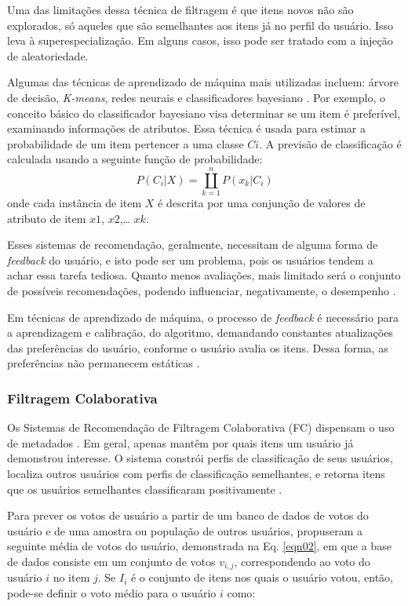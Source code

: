 Uma das limitações dessa técnica de filtragem é que itens novos não são explorados, só aqueles que são semelhantes 
aos itens já no perfil do usuário. Isso leva à superespecialização. Em alguns casos, isso pode ser tratado com a 
injeção de aleatoriedade\cite{paulson2003}.


Algumas das técnicas de aprendizado de máquina mais utilizadas incluem: árvore de decisão, \emph{K-means}, redes neurais e classificadores 
bayesiano \cite{son2017}. Por exemplo, o conceito básico do classificador bayesiano visa determinar se um item é preferível, examinando informações de 
atributos. Essa técnica é usada para estimar a probabilidade de um item 
pertencer a uma classe $Ci$. A previsão de classificação é calculada usando a 
seguinte função de probabilidade:
\begin{equation}
	P(C_{i}|X) = \coprod _{k=1}^{n} P(x_{k}|C_{i})
\end{equation}
onde cada instância de item $X$ é descrita por uma conjunção de valores de atributo de item $x1$, $x2$,… $xk$. 


Esses sistemas de recomendação, geralmente, necessitam de alguma forma de \emph{feedback} do usuário, e isto pode ser 
um problema, pois os usuários tendem a achar essa tarefa tediosa. Quanto menos avaliações, mais limitado 
será o conjunto de possíveis recomendações, podendo influenciar, negativamente, o desempenho \cite{paulson2003}. 

Em técnicas de aprendizado de máquina, o processo de \emph{feedback} é necessário para a aprendizagem e calibração, 
do algoritmo, demandando constantes atualizações das preferências do usuário, conforme o usuário avalia os itens. Dessa forma, 
as preferências não permanecem estáticas \cite{paulson2003}. 



\subsubsection{Filtragem Colaborativa}

Os Sistemas de Recomendação de Filtragem Colaborativa (FC) dispensam o uso de metadados \cite{mauricio}. 
Em geral, apenas mantêm por quais itens um usuário já demonstrou interesse. O sistema constrói perfis de classificação 
de seus usuários, localiza outros usuários com perfis de classificação 
semelhantes, e retorna itens que os usuários semelhantes classificaram 
positivamente \cite{son2017}.

Para prever os votos de usuário a partir de um banco de dados de votos do usuário e de uma amostra ou população de outros usuários, 
 propuseram a seguinte média de votos do usuário, demonstrada na  Eq. \ref{eqn02}, em que a base de dados 
consiste em um conjunto de votos $v_{i,j}$, correspondendo ao voto do usuário $i$ no item $j$. Se $I_{i}$ é o
conjunto de itens nos quais o usuário votou, então, pode-se definir o voto médio para o usuário $i$ como:

